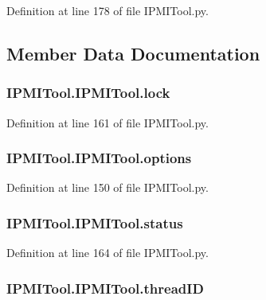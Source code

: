 Definition at line 178 of file I\-P\-M\-I\-Tool.\-py.



\subsection{Member Data Documentation}
\hypertarget{classIPMITool_1_1IPMITool_a36a9429fca7200e0a6d1d78002b95d11}{
\subsubsection[{lock}]{\setlength{\rightskip}{0pt plus 5cm}I\-P\-M\-I\-Tool.\-I\-P\-M\-I\-Tool.\-lock}}\label{classIPMITool_1_1IPMITool_a36a9429fca7200e0a6d1d78002b95d11}


Definition at line 161 of file I\-P\-M\-I\-Tool.\-py.

\hypertarget{classIPMITool_1_1IPMITool_a9f0f9484b1b8f6a0df8338f7894c8823}{
\subsubsection[{options}]{\setlength{\rightskip}{0pt plus 5cm}I\-P\-M\-I\-Tool.\-I\-P\-M\-I\-Tool.\-options}}\label{classIPMITool_1_1IPMITool_a9f0f9484b1b8f6a0df8338f7894c8823}


Definition at line 150 of file I\-P\-M\-I\-Tool.\-py.

\hypertarget{classIPMITool_1_1IPMITool_a4dba85133ceca9edff481c575cb468d9}{
\subsubsection[{status}]{\setlength{\rightskip}{0pt plus 5cm}I\-P\-M\-I\-Tool.\-I\-P\-M\-I\-Tool.\-status}}\label{classIPMITool_1_1IPMITool_a4dba85133ceca9edff481c575cb468d9}


Definition at line 164 of file I\-P\-M\-I\-Tool.\-py.

\hypertarget{classIPMITool_1_1IPMITool_aaa15d2dc90d9e3a45adc4519912c811d}{
\subsubsection[{thread\-I\-D}]{\setlength{\rightskip}{0pt plus 5cm}I\-P\-M\-I\-Tool.\-I\-P\-M\-I\-Tool.\-thread\-I\-D}}\label{classIPMITool_1_1IPMITool_aaa15d2dc90d9e3a45adc4519912c811d}


